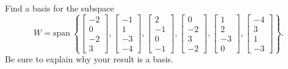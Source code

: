 \documentclass{article}
\begin{document}
\begin{exerciseStatement}
    Find a basis for the subspace
\[W=\mathrm{span}\ \left\{\left[\begin{array}{r}
-2 \\
0 \\
-2 \\
3
\end{array}\right] , \left[\begin{array}{r}
-1 \\
1 \\
-3 \\
-4
\end{array}\right] , \left[\begin{array}{r}
2 \\
-1 \\
0 \\
-1
\end{array}\right] , \left[\begin{array}{r}
0 \\
-2 \\
3 \\
-2
\end{array}\right] , \left[\begin{array}{r}
1 \\
2 \\
-3 \\
0
\end{array}\right] , \left[\begin{array}{r}
-4 \\
3 \\
1 \\
-3
\end{array}\right]\right\}.\]
 Be sure to explain why your result is a basis.


  
\end{exerciseStatement}
\end{document}
